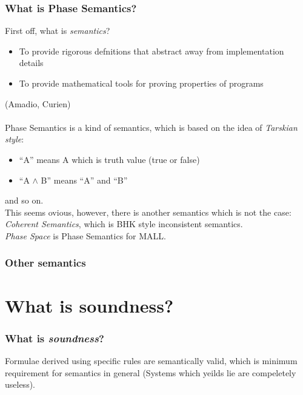 \documentclass[dvipdfmx,cjk]{beamer}
\theoremstyle{example}
\begin{document}
\begin{frame}
  \frametitle{What is Phase Semantics?}
  First off, what is \textit{semantics}?

  \begin{itemize}
    \item To provide rigorous defnitions that abstract away from implementation
      details
    \item To provide mathematical tools for proving properties of programs
  \end{itemize}
   (Amadio, Curien)\\~\\

  Phase Semantics is a kind of semantics, which is based on the idea of \textit{Tarskian style}: \\

  \begin{itemize}
    \item ``A'' means A which is truth value (true or false)
    \item ``A $\wedge$ B'' means ``A'' and ``B''
  \end{itemize}

  and so on.\\

  This seems ovious, however, there is another semantics which is not the case: \textit{Coherent Semantics}, which is BHK style inconsistent semantics. \\

  \textit{Phase Space} is Phase Semantics for MALL.
  
\end{frame}

\begin{frame}
  \frametitle{Other semantics}
\end{frame}

\section{What is soundness?}
                          
\begin{frame}
  \frametitle{What is \textit{soundness}?} 

  Formulae derived using specific rules are semantically valid, which is minimum requirement for semantics in general (Systems which yeilds lie are compeletely useless).
  
\end{frame}
\end{document}
